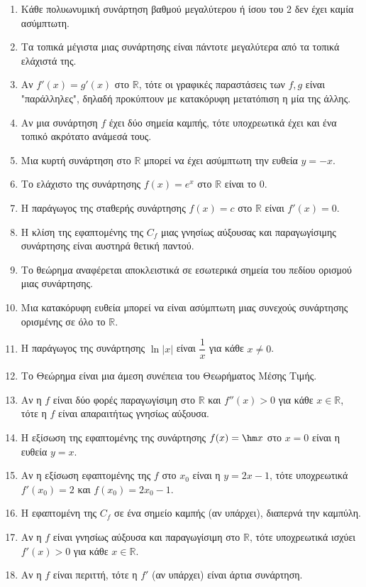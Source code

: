 \begin{enumerate}[label=\textbf{2.\arabic*.}]
    \item Κάθε πολυωνυμική συνάρτηση βαθμού μεγαλύτερου ή ίσου του 2 δεν έχει καμία ασύμπτωτη.
    \item Τα τοπικά μέγιστα μιας συνάρτησης είναι πάντοτε μεγαλύτερα από τα τοπικά ελάχιστά της.
    \item Αν $f'(x) = g'(x)$ στο $\mathbb{R}$, τότε οι γραφικές παραστάσεις των $f, g$ είναι "παράλληλες", δηλαδή προκύπτουν με κατακόρυφη μετατόπιση η μία της άλλης.
    \item Αν μια συνάρτηση $f$ έχει δύο σημεία καμπής, τότε υποχρεωτικά έχει και ένα τοπικό ακρότατο ανάμεσά τους.
    \item Μια κυρτή συνάρτηση στο $\mathbb{R}$ μπορεί να έχει ασύμπτωτη την ευθεία $y = -x$.
    \item Το ελάχιστο της συνάρτησης $f(x) = e^x$ στο $\mathbb{R}$ είναι το 0.
    \item Η παράγωγος της σταθερής συνάρτησης $f(x) = c$ στο $\mathbb{R}$ είναι $f'(x) = 0$.
    \item Η κλίση της εφαπτομένης της $C_f$ μιας γνησίως αύξουσας και παραγωγίσιμης συνάρτησης είναι αυστηρά θετική παντού.
    \item Το θεώρημα  αναφέρεται αποκλειστικά σε εσωτερικά σημεία του πεδίου ορισμού μιας συνάρτησης.
    \item Μια κατακόρυφη ευθεία μπορεί να είναι ασύμπτωτη μιας συνεχούς συνάρτησης ορισμένης σε όλο το $\mathbb{R}$.
    \item Η παράγωγος της συνάρτησης $\ln |x|$ είναι $\dfrac{1}{x}$ για κάθε $x \neq 0$.
    \item Το Θεώρημα  είναι μια άμεση συνέπεια του Θεωρήματος Μέσης Τιμής.
    \item Αν η $f$ είναι δύο φορές παραγωγίσιμη στο $\mathbb{R}$ και $f''(x) > 0$ για κάθε $x \in \mathbb{R}$, τότε η $f$ είναι απαραιτήτως γνησίως αύξουσα.
    \item Η εξίσωση της εφαπτομένης της συνάρτησης $f(x) = \hm x$ στο $x=0$ είναι η ευθεία $y=x$.
    \item Αν η εξίσωση εφαπτομένης της $f$ στο $x_0$ είναι η $y=2x-1$, τότε υποχρεωτικά $f'(x_0) = 2$ και $f(x_0) = 2x_0-1$.
    \item Η εφαπτομένη της $C_f$ σε ένα σημείο καμπής (αν υπάρχει), διαπερνά την καμπύλη.
    \item Αν η $f$ είναι γνησίως αύξουσα και παραγωγίσιμη στο $\mathbb{R}$, τότε υποχρεωτικά ισχύει $f'(x) > 0$ για κάθε $x \in \mathbb{R}$.
    \item Αν η $f$ είναι περιττή, τότε η $f'$ (αν υπάρχει) είναι άρτια συνάρτηση.

\end{enumerate}
